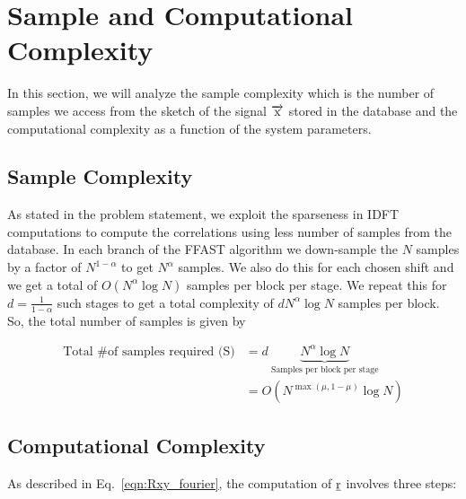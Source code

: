 \section{Sample and Computational Complexity}
In this section, we will analyze the sample complexity which is the  number of samples we access from the sketch of the signal $\overrightarrow{\mathrm{x}}$ stored in the database and the computational complexity as a function of the system parameters.

\subsection{\bf Sample Complexity} As stated in the problem statement, we exploit the sparseness in IDFT computations to compute the correlations using less number of samples from the database. In each branch of the FFAST algorithm we down-sample the $N$ samples by a factor of $N^{1-\alpha}$ to get $N^{\alpha}$ samples. We also do this for each chosen shift and we get a total of  $O(N^{\alpha}\log N)$ samples per block per stage. We repeat this for $d = \frac{1}{1-\alpha}$ such stages to get a total complexity of $dN^{\alpha}\log N$ samples per block. So, the total number of samples is given by  

\begin{align*}
\text{Total \# of samples required (S)} &=  d \ \underset{\text{Samples per block per stage} }{\underbrace{N^{\alpha}\log N}}\\
   &=   O(N^{\max(\mu,1-\mu)}\log N)
\end{align*}



\subsection{\bf Computational Complexity}

As described in Eq.~\ref{eqn:Rxy_fourier}, the computation of $\underline{\mathrm{r}}$ involves three steps:

